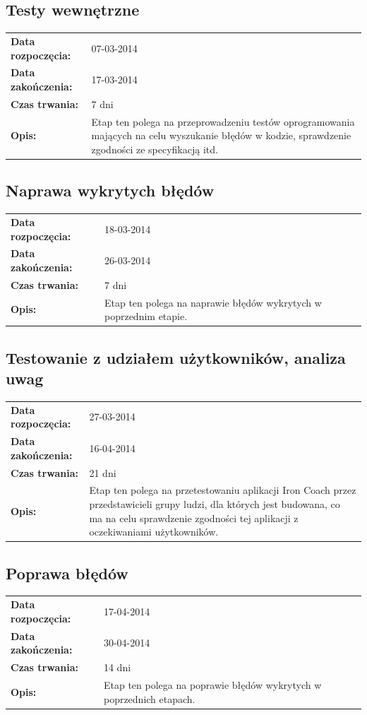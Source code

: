 \subsection{Testy wewnętrzne}
	\begin{tabular}{l p{5cm}}
		\textbf{Data rozpoczęcia:} & 07-03-2014\\
		\textbf{Data zakończenia:} & 17-03-2014\\
		\textbf{Czas trwania:} & 7 dni\\
		\textbf{Opis:} & Etap ten polega na przeprowadzeniu testów oprogramowania mających na celu wyszukanie błędów w kodzie, sprawdzenie zgodności ze specyfikacją itd.
	\end{tabular}
\subsection{Naprawa wykrytych błędów}
	\begin{tabular}{l p{5cm}}
		\textbf{Data rozpoczęcia:} & 18-03-2014\\
		\textbf{Data zakończenia:} & 26-03-2014\\
		\textbf{Czas trwania:} & 7 dni\\
		\textbf{Opis:} & Etap ten polega na naprawie błędów wykrytych w poprzednim etapie.
	\end{tabular}
\subsection{Testowanie z udziałem użytkowników, analiza uwag}
	\begin{tabular}{l p{5cm}}
		\textbf{Data rozpoczęcia:} & 27-03-2014\\
		\textbf{Data zakończenia:} & 16-04-2014\\
		\textbf{Czas trwania:} & 21 dni\\
		\textbf{Opis:} & Etap ten polega na przetestowaniu aplikacji Iron Coach przez przedstawicieli grupy ludzi, dla których jest budowana, co ma na celu sprawdzenie zgodności tej aplikacji z oczekiwaniami użytkowników.
	\end{tabular}
\subsection{Poprawa błędów}
	\begin{tabular}{l p{5cm}}
		\textbf{Data rozpoczęcia:} & 17-04-2014\\
		\textbf{Data zakończenia:} & 30-04-2014\\
		\textbf{Czas trwania:} & 14 dni\\
		\textbf{Opis:} & Etap ten polega na poprawie błędów wykrytych w poprzednich etapach. 
	\end{tabular}
